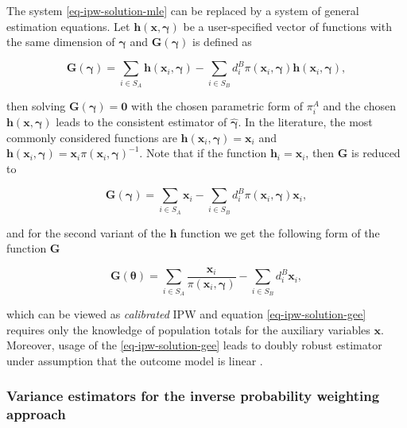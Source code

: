 \documentclass[
]{jss}
\begin{document}
The system \eqref{eq-ipw-solution-mle} can be replaced by a system of
general estimation equations. Let
\(\boldsymbol{h}(\boldsymbol{x}, \boldsymbol{\gamma})\) be a
user-specified vector of functions with the same dimension of
\(\boldsymbol{\gamma}\) and \(\boldsymbol{G}(\boldsymbol{\gamma})\) is
defined as

\begin{equation}
\label{gee}
\boldsymbol{G}(\boldsymbol{\gamma})=\sum_{i \in S_A} \boldsymbol{h}\left(\boldsymbol{x}_i, \boldsymbol{\gamma}\right)-\sum_{i \in S_B} d_i^B \pi\left(\boldsymbol{x}_i, \boldsymbol{\gamma}\right) \boldsymbol{h}\left(\boldsymbol{x}_i, \boldsymbol{\gamma}\right),
\end{equation}

then solving \(\boldsymbol{G}(\boldsymbol{\gamma})=\boldsymbol{0}\) with
the chosen parametric form of \(\pi_i^A\) and the chosen
\(\boldsymbol{h}(\boldsymbol{x},\boldsymbol{\gamma})\) leads to the
consistent estimator of \(\hat{\boldsymbol{\gamma}}\). In the
literature, the most commonly considered functions are
\(\boldsymbol{h}\left(\boldsymbol{x}_i, \boldsymbol{\gamma}\right) = \boldsymbol{x}_i\)
and
\(\boldsymbol{h}\left(\boldsymbol{x}_i, \boldsymbol{\gamma}\right) = \boldsymbol{x}_i \pi\left(\boldsymbol{x}_i, \boldsymbol{\gamma}\right)^{-1}\).
Note that if the function \(\boldsymbol{h}_i=\boldsymbol{x}_i\), then
\(\boldsymbol{G}\) is reduced to

\[
\boldsymbol{G}(\boldsymbol{\gamma}) = \sum_{i \in S_A} \boldsymbol{x}_i-\sum_{i \in S_B} d_i^B \pi\left(\boldsymbol{x}_i, \boldsymbol{\gamma}\right) \boldsymbol{x}_i,
\]

and for the second variant of the \(\boldsymbol{h}\) function we get the
following form of the function \(\boldsymbol{G}\)

\begin{equation}
\boldsymbol{G}(\boldsymbol{\theta}) = \sum_{i \in S_A} \frac{\boldsymbol{x}_i}{\pi\left(\boldsymbol{x}_i, \boldsymbol{\gamma}\right) }-\sum_{i \in S_B} d_i^B \boldsymbol{x}_i,
\label{eq-ipw-solution-gee}
\end{equation}

which can be viewed as \textit{calibrated} IPW and equation
\eqref{eq-ipw-solution-gee} requires only the knowledge of population
totals for the auxiliary variables \(\boldsymbol{x}\). Moreover, usage
of the \eqref{eq-ipw-solution-gee} leads to doubly robust estimator
under assumption that the outcome model is linear
\citep{kim_theory_2012}.

\subsubsection{Variance estimators for the inverse probability weighting
approach}\label{variance-estimators-for-the-inverse-probability-weighting-approach}
\end{document}
